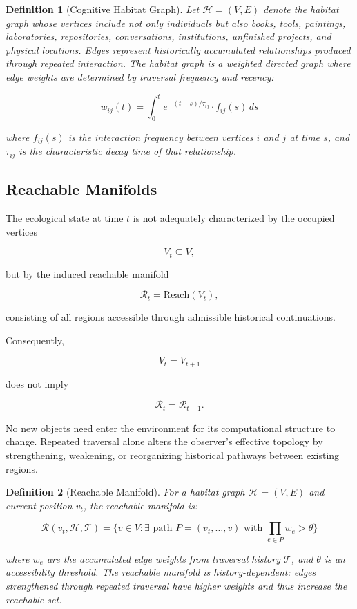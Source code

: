 \documentclass[12pt,oneside]{article}
\newtheorem{definition}{Definition}[section]
\theoremstyle{remark}
\begin{document}
\begin{definition}[Cognitive Habitat Graph]
Let \(\mathcal{H} = (V,E)\) denote the habitat graph whose vertices include not only individuals but also books, tools, paintings, laboratories, repositories, conversations, institutions, unfinished projects, and physical locations. Edges represent historically accumulated relationships produced through repeated interaction. The habitat graph is a weighted directed graph where edge weights are determined by traversal frequency and recency:

\[
w_{ij}(t) = \int_{0}^{t} e^{-(t-s)/\tau_{ij}} \cdot f_{ij}(s) \, ds
\]

where \(f_{ij}(s)\) is the interaction frequency between vertices \(i\) and \(j\) at time \(s\), and \(\tau_{ij}\) is the characteristic decay time of that relationship.
\end{definition}

\subsection{Reachable Manifolds}

The ecological state at time \(t\) is not adequately characterized by the occupied vertices

\[
V_t \subseteq V,
\]

but by the induced reachable manifold

\[
\mathcal{R}_t = \text{Reach}(V_t),
\]

consisting of all regions accessible through admissible historical continuations.

Consequently,

\[
V_t = V_{t+1}
\]

does not imply

\[
\mathcal{R}_t = \mathcal{R}_{t+1}.
\]

No new objects need enter the environment for its computational structure to change. Repeated traversal alone alters the observer's effective topology by strengthening, weakening, or reorganizing historical pathways between existing regions.

\begin{definition}[Reachable Manifold]
For a habitat graph \(\mathcal{H} = (V,E)\) and current position \(v_t\), the reachable manifold is:

\[
\mathcal{R}(v_t, \mathcal{H}, \mathcal{T}) = \{v \in V : \exists \text{ path } P = (v_t, \ldots, v) \text{ with } \prod_{e \in P} w_e > \theta\}
\]

where \(w_e\) are the accumulated edge weights from traversal history \(\mathcal{T}\), and \(\theta\) is an accessibility threshold. The reachable manifold is history-dependent: edges strengthened through repeated traversal have higher weights and thus increase the reachable set.
\end{definition}
\end{document}
